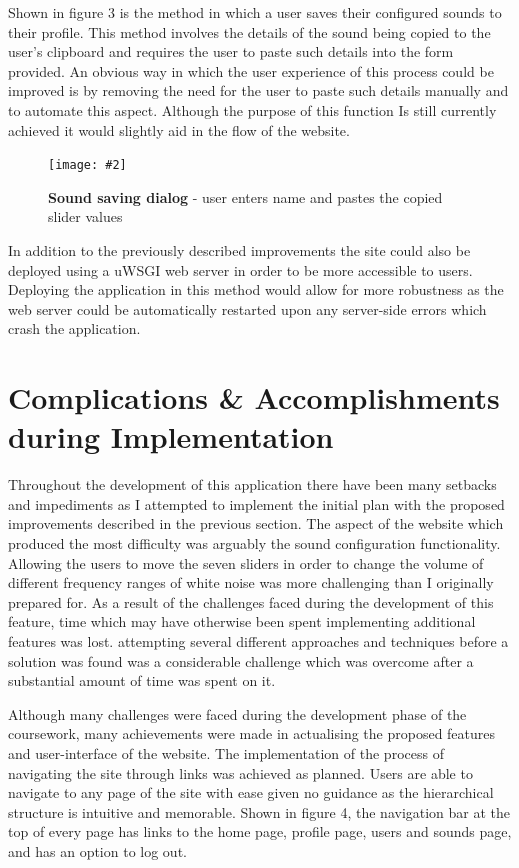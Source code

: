 \documentclass[10pt, a4paper]{article}
\newcommand{\figuremacro}[5]{
    \begin{figure}[#1]
        \centering
        \texttt{[image: \#2]}
        \caption[#3]{\textbf{#3}#4}
        \label{fig:#2}
    \end{figure}
}
\begin{document}
Shown in figure 3 is the method in which a user saves their configured sounds to their profile. This method involves the details of the sound being copied to the user\rq s clipboard and requires the user to paste such details into the form provided. An obvious way in which the user experience of this process could be improved is by removing the need for the user to paste such details manually and to automate this aspect. Although the purpose of this function Is still currently achieved it would slightly aid in the flow of the website.\\

\figuremacro{h}{3}{Sound saving dialog}{ - user enters name and pastes the copied slider values}{1.0}

In addition to the previously described improvements the site could also be deployed using a uWSGI web server in order to be more accessible to users. Deploying the application in this method would allow for more robustness as the web server could be automatically restarted upon any server-side errors which crash the application. 



\section{Complications \& Accomplishments during Implementation}
Throughout the development of this application there have been many setbacks and impediments as I attempted to implement the initial plan with the proposed improvements described in the previous section. The aspect of the website which produced the most difficulty was arguably the sound configuration functionality. Allowing the users to move the seven sliders in order to change the volume of different frequency ranges of white noise was more challenging than I originally prepared for. As a result of the challenges faced during the development of this feature, time which may have otherwise been spent implementing additional features was lost. attempting several different approaches and techniques before a solution was found was a considerable challenge which was overcome after a substantial amount of time was spent on it.

Although many challenges were faced during the development phase of the coursework, many achievements were made in actualising the proposed features and user-interface of the website. The implementation of the process of navigating the site through links was achieved as planned. Users are able to navigate to any page of the site with ease given no guidance as the hierarchical structure is intuitive and memorable. Shown in figure 4, the navigation bar at the top of every page has links to the home page, profile page, users and sounds page, and has an option to log out. 
\end{document}
